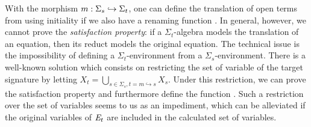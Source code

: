 With the morphism $m : \Sigma_s \hookrightarrow \Sigma_t$, one can define
the translation of open terms from 
using initiality if we also have a renaming function .
In general, however, we cannot prove the
\emph{satisfaction property}: if a $\Sigma_t$-algebra models the
translation of an equation, then its reduct models the original
equation. The technical issue is the impossibility of defining a
$\Sigma_t$-environment from a $\Sigma_s$-environment. There is a
well-known solution which consists on restricting the set of variable
of the target signature by letting
$X_t = \bigcup_{s \in \Sigma_s , t = m \hookrightarrow s} X_s$.  Under
this restriction, we can prove the satisfaction property and
furthermore define the function . Such a restriction
over the set of variables seems to us as an impediment,
which can be alleviated if the original variables of $\mathit{E}_{t}$ are
included in the calculated set of variables.











